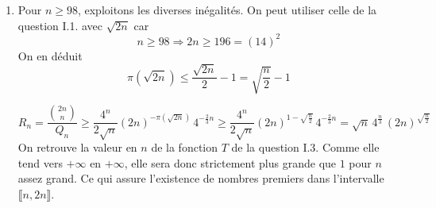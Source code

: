 \begin{enumerate}
  \item Pour $n\geq 98$, exploitons les diverses inégalités.\newline
On peut utiliser celle de la question I.1. avec $\sqrt{2n}$ car 
\begin{displaymath}
  n\geq 98 \Rightarrow 2n\geq 196 = (14)^2
\end{displaymath}
On en déduit 
\begin{displaymath}
  \pi(\sqrt{2n})\leq \frac{\sqrt{2n}}{2} - 1 = \sqrt{\frac{n}{2}} - 1
\end{displaymath}

\begin{displaymath}
R_n = \frac{\binom{2n}{n}}{Q_n}
\geq \frac{4^n}{2\sqrt{n}} (2n)^{-\pi(\sqrt{2n})}\,4^{-\frac{2}{3}n}
\geq \frac{4^n}{2\sqrt{n}} (2n)^{1-\sqrt{\frac{n}{2}}}\,4^{-\frac{2}{3}n}
= \sqrt{n}\, 4^{\frac{n}{3}}\, (2n)^{\sqrt{\frac{n}{2}}}
\end{displaymath}
On retrouve la valeur en $n$ de la fonction $T$ de la question I.3. Comme elle tend vers $+\infty$ en $+\infty$, elle sera donc strictement plus grande que $1$ pour $n$ assez grand. Ce qui assure l'existence de nombres premiers dans l'intervalle $\llbracket n, 2n\rrbracket$.
\end{enumerate}

